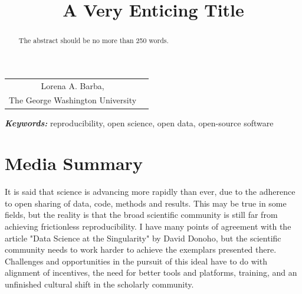 \documentclass[]{hdsr}
\begin{document}




\begin{center}

  \title{A Very Enticing Title}
  \maketitle

  \thispagestyle{empty}
  
  \vspace*{.2in}

  \begin{tabular}{cc}
    Lorena A. Barba\upstairs{\affilone,*},
   \\[0.25ex]
   {\small \upstairs{\affilone} The George Washington University} \\
  \end{tabular}
  
  \vspace*{0.4in}

\begin{abstract}
The abstract should be no more than 250 words.
\end{abstract}
\end{center}

\vspace*{0.15in}
\hspace{10pt}
  \small	
  \textbf{\textit{Keywords: }} {reproducibility, open science, open data, open-source software}
  
\copyrightnotice

\section*{Media Summary}

It is said that science is advancing more rapidly than ever, due to the adherence to open sharing of data, code, methods and results. This may be true in some fields, but the reality is that the broad scientific community is still far from achieving frictionless reproducibility. I have many points of agreement with the article "Data Science at the Singularity" by David Donoho, but the scientific community needs to work harder to achieve the exemplars presented there. Challenges and opportunities in the pursuit of this ideal have to do with alignment of incentives, the need for better tools and platforms, training, and an unfinished cultural shift in the scholarly community.
\end{document}
